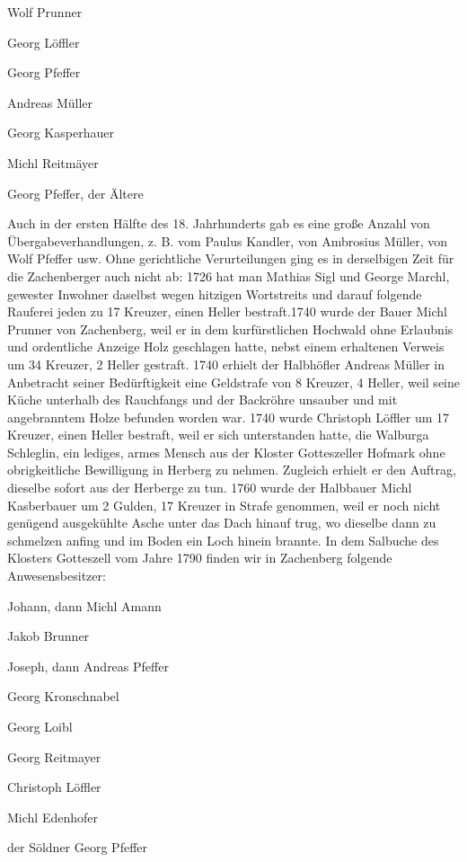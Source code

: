 \documentclass{book}
\begin{document}
Wolf Prunner

Georg Löffler

Georg Pfeffer

Andreas Müller

Georg Kasperhauer

Michl Reitmäyer

Georg Pfeffer, der Ältere



Auch in der ersten Hälfte des 18. Jahrhunderts gab es eine große Anzahl von
Übergabeverhandlungen, z. B. vom Paulus Kandler, von Ambrosius Müller, von Wolf
Pfeffer usw. Ohne gerichtliche Verurteilungen ging es in derselbigen Zeit für
die Zachenberger auch nicht ab: 1726 hat man Mathias Sigl und George Marchl,
gewester Inwohner daselbst wegen hitzigen Wortstreits und darauf folgende
Rauferei jeden zu 17 Kreuzer, einen Heller bestraft.1740 wurde der Bauer Michl
Prunner von Zachenberg, weil er in dem kurfürstlichen Hochwald ohne Erlaubnis
und ordentliche Anzeige Holz geschlagen hatte, nebst einem erhaltenen Verweis um
34 Kreuzer, 2 Heller gestraft. 1740 erhielt der Halbhöfler Andreas Müller in
Anbetracht seiner Bedürftigkeit eine Geldstrafe von 8 Kreuzer, 4 Heller, weil
seine Küche unterhalb des Rauchfangs und der Backröhre unsauber und mit
angebranntem Holze befunden worden war. 1740 wurde Christoph Löffler um 17
Kreuzer, einen Heller bestraft, weil er sich unterstanden hatte, die Walburga
Schleglin, ein lediges, armes Mensch aus der Kloster Gotteszeller Hofmark ohne
obrigkeitliche Bewilligung in Herberg zu nehmen. Zugleich erhielt er den
Auftrag, dieselbe sofort aus der Herberge zu tun. 1760 wurde der Halbbauer Michl
Kasberbauer um 2 Gulden, 17 Kreuzer in Strafe genommen, weil er noch nicht
genügend ausgekühlte Asche unter das Dach hinauf trug, wo dieselbe dann zu
schmelzen anfing und im Boden ein Loch hinein brannte. In dem Salbuche des
Klosters Gotteszell vom Jahre 1790 finden wir in Zachenberg folgende
Anwesensbesitzer:



Johann, dann Michl Amann

Jakob Brunner

Joseph, dann Andreas Pfeffer

Georg Kronschnabel

Georg Loibl

Georg Reitmayer

Christoph Löffler

Michl Edenhofer

der Söldner Georg Pfeffer
\end{document}
